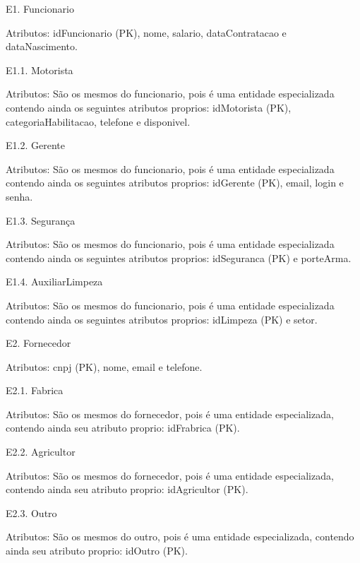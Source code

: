\documentclass[12pt, onecolumn, titlepage]{article}
\begin{document}
\begin{description}

\item E1. Funcionario
\item \qquad Atributos: idFuncionario (PK), nome, salario, dataContratacao e dataNascimento.

\item E1.1. Motorista
\item \qquad Atributos: São os mesmos do funcionario, pois é uma entidade especializada contendo ainda os seguintes atributos proprios: idMotorista (PK), categoriaHabilitacao, telefone e disponivel.

\item E1.2. Gerente
\item \qquad Atributos: São os mesmos do funcionario, pois é uma entidade especializada contendo ainda os seguintes atributos proprios: idGerente (PK), email, login e senha.

\item E1.3. Segurança
\item \qquad Atributos: São os mesmos do funcionario, pois é uma entidade especializada contendo ainda os seguintes atributos proprios: idSeguranca (PK) e porteArma.

\item E1.4. AuxiliarLimpeza
\item \qquad Atributos: São os mesmos do funcionario, pois é uma entidade especializada contendo ainda os seguintes atributos proprios: idLimpeza (PK) e setor.

\item E2. Fornecedor
\item \qquad Atributos: cnpj (PK), nome, email e telefone.

\item E2.1. Fabrica
\item \qquad Atributos: São os mesmos do fornecedor, pois é uma entidade especializada, contendo ainda seu atributo proprio: idFrabrica (PK).

\item E2.2. Agricultor
\item \qquad Atributos: São os mesmos do fornecedor, pois é uma entidade especializada, contendo ainda seu atributo proprio: idAgricultor (PK).

\item E2.3. Outro
\item \qquad Atributos: São os mesmos do outro, pois é uma entidade especializada, contendo ainda seu atributo proprio: idOutro (PK).


\end{description}
\end{document}
